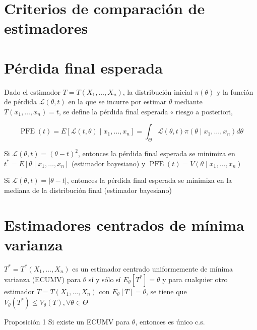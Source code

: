 \section*{Criterios de comparación de estimadores}
\section*{Pérdida final esperada}
Dado el estimador $T=T\left(X_{1}, \ldots, X_{n}\right)$, la distribución inicial $\pi(\theta)$ y la función de pérdida $\mathcal{L}(\theta, t)$ en la que se incurre por estimar $\theta$ mediante $T\left(x_{1}, \ldots, x_{n}\right)=t$, se define la pérdida final esperada $\circ$ riesgo a posteriori,

$$
  \operatorname{PFE}(t)=E\left[\mathcal{L}(t, \theta) \mid x_{1}, \ldots, x_{n}\right]=\int_{\Theta} \mathcal{L}(\theta, t) \pi\left(\theta \mid x_{1}, \ldots, x_{n}\right) d \theta
$$

Si $\mathcal{L}(\theta, t)=(\theta-t)^{2}$, entonces la pérdida final esperada se minimiza en $t^{*}=E\left[\theta \mid x_{1}, \ldots, x_{n}\right]$ (estimador bayesiano) y $\operatorname{PFE}(t)=V\left(\theta \mid x_{1}, \ldots, x_{n}\right)$

Si $\mathcal{L}(\theta, t)=|\theta-t|$, entonces la pérdida final esperada se minimiza en la mediana de la distribución final (estimador bayesiano)

\section*{Estimadores centrados de mínima varianza}
$T^{*}=T^{*}\left(X_{1}, \ldots, X_{n}\right)$ es un estimador centrado uniformemente de mínima varianza (ECUMV) para $\theta$ sí y sólo sí $E_{\theta}\left[T^{*}\right]=\theta$ y para cualquier otro estimador $T=T\left(X_{1}, \ldots, X_{n}\right)$ con $E_{\theta}[T]=\theta$, se tiene que $V_{\theta}\left(T^{*}\right) \leq V_{\theta}(T), \forall \theta \in \Theta$

Proposición 1 Si existe un ECUMV para $\theta$, entonces es único c.s.

